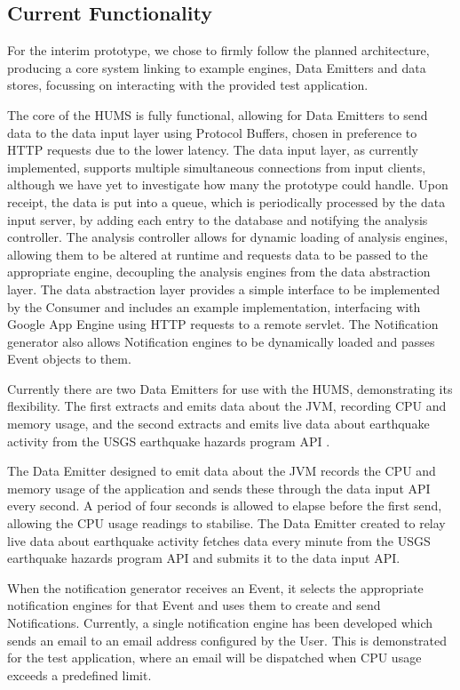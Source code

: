 \documentclass[10pt,a4paper]{article}
\begin{document}
\subsection{Current Functionality}
For the interim prototype, we chose to firmly follow the planned architecture, producing a core system linking to example engines, Data Emitters and data stores, focussing on interacting with the provided test application.

The core of the HUMS is fully functional, allowing for Data Emitters to send data 
to the data input layer using Protocol Buffers, chosen in preference to HTTP 
requests due to the lower latency. The data input layer, as currently 
implemented, supports multiple simultaneous connections from input clients, 
although we have yet to investigate how many the prototype could handle. 
Upon receipt, the data is put into a queue, which is periodically processed by 
the data input server, by adding each entry to the database and notifying the 
analysis controller. The analysis controller allows for dynamic loading of 
analysis engines, allowing them to be altered at runtime and requests data to 
be passed to the appropriate engine, decoupling the analysis engines from the 
data abstraction layer. The data abstraction layer provides a simple interface to 
be implemented by the Consumer and includes an example implementation, 
interfacing with Google App Engine using HTTP requests to a remote servlet. 
The Notification generator also allows Notification engines to be dynamically 
loaded and passes Event objects to them.

Currently there are two Data Emitters for use with the HUMS, demonstrating its 
flexibility. The first extracts and emits data about the JVM, recording CPU and 
memory usage, and the second extracts and emits live data about earthquake 
activity from the USGS earthquake hazards program API \cite{usgs}.

The Data Emitter designed to emit data about the JVM records the CPU and 
memory usage of the application and sends these through the data input API 
every second. A period of four seconds is allowed to elapse before the first 
send, allowing the CPU usage readings to stabilise. The Data Emitter created to 
relay live data about earthquake activity fetches data every minute from the 
USGS earthquake hazards program API and submits it to the data input API.


When the notification generator receives an Event, it selects the appropriate 
notification engines for that Event and uses them to create and send  
Notifications. Currently, a single notification engine has been developed which 
sends an email to an email address configured by the User. This is 
demonstrated for the test application, where an email will be dispatched when 
CPU usage exceeds a predefined limit.
\end{document}
